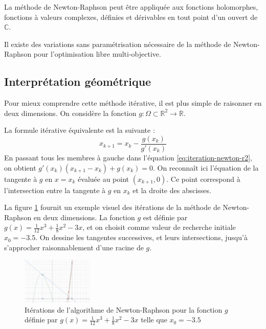 \documentclass[3p, twocolumn]{elsarticle}
\begin{document}
\begin{rmk}
    La méthode de Newton-Raphson peut être appliquée aux fonctions holomorphes, fonctions à valeurs complexes, définies et dérivables en tout point d'un ouvert de $\mathbb{C}$.
\end{rmk}
\begin{rmk}
    Il existe des variations sans paramétrisation nécessaire de la méthode de Newton-Raphson pour l'optimisation libre multi-objective. \cite{art:Fliege_Drummond_Svaiter_2009}
\end{rmk}
\subsection{Interprétation géométrique}
Pour mieux comprendre cette méthode itérative, il est plus simple de raisonner en deux dimensions. On considère la fonction $g :\Omega\subset\mathbb R^2 \rightarrow \mathbb R$.

La formule itérative équivalente est la suivante :
\begin{equation}
    x_{k+1}=x_k-\frac{g(x_k)}{g'(x_k)}
    \label{eq:iteration-newton-r2}
\end{equation}
En passant tous les membres à gauche dans l'équation \ref{eq:iteration-newton-r2}, on obtient $g'(x_k)(x_{k+1}-x_k)+g(x_k)=0$. On reconnaît ici l'équation de la tangente à $g$ en $x=x_k$ évaluée au point $(x_{k+1},0)$.
Ce point correspond à l'intersection entre la tangente à $g$ en $x_k$ et la droite des abscisses.

La figure \ref{fig:nr-iterations-1} fournit un exemple visuel des itérations de la méthode de Newton-Raphson en deux dimensions. La fonction $g$ est définie par $g(x)=\frac{1}{12}x^3+\frac18x^2-3x$, et on choisit comme valeur de recherche initiale $x_0=-3.5$. On dessine les tangentes successives, et leurs intersections, jusqu'à s'approcher raisonnablement d'une racine de $g$.

\begin{figure}[htbp]
    \centering
    \includegraphics[width = 0.3\textwidth]{iteration-newton-1.png}
    \caption{Itérations de l'algorithme de Newton-Raphson pour la fonction $g$ définie par $g(x)=\frac{1}{12}x^3+\frac18x^2-3x$ telle que $x_0=-3.5$}
    \label{fig:nr-iterations-1}
\end{figure}
\end{document}
